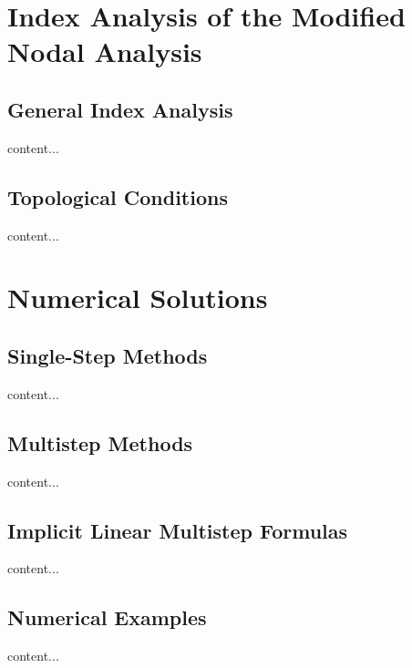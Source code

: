 \section{Index Analysis of the Modified Nodal Analysis}
	\subsection{General Index Analysis}
	\begin{frame}
		content...
	\end{frame}
	\subsection{Topological Conditions}
	\begin{frame}
		content...
	\end{frame}

\section{Numerical Solutions}
	\subsection{Single-Step Methods}
	\begin{frame}
		content...
	\end{frame}
	\subsection{Multistep Methods}
	\begin{frame}
		content...
	\end{frame}
	\subsection{Implicit Linear Multistep Formulas}
	\begin{frame}
		content...
	\end{frame}
	\subsection{Numerical Examples}
	\begin{frame}
		content...
	\end{frame}
